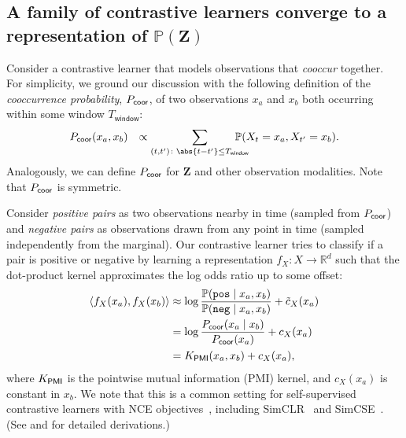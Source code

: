 \documentclass{article}
\theoremstyle{plain}
\theoremstyle{definition}
\theoremstyle{remark}
\begin{document}
\subsection{A family of contrastive learners converge to a representation of $\mathbb{P}(\mathbf{Z})$}
\label{sec:simple-contra-kpmi}

Consider a contrastive learner that models observations that \textit{cooccur} together. For simplicity, we ground our discussion with the following definition of the \textit{cooccurrence probability}, ${P}_\mathsf{coor}$, of two observations $x_a$ and $x_b$ both occurring within some  window $T_\mathsf{window}$: %
\begin{align}
    \Pco(x_a, x_b) \hspace{0.1in} \propto \hspace{-0in} \sum_{(t, t') \colon \abs{t-t'} \leq T_\mathsf{window}} \hspace{-0.2in} \mathbb{P}(X_t = x_a, X_{t'} = x_b).\nonumber
\end{align}
Analogously, we can define ${P}_\mathsf{coor}$ for $\mathbf{Z}$ and other observation modalities. Note that ${P}_\mathsf{coor}$ is symmetric.

Consider \emph{positive pairs} as two observations nearby in time (sampled from ${P}_\mathsf{coor}$) and \emph{negative pairs} as observations drawn from any point in time (sampled independently from the marginal). Our contrastive learner tries to classify if a pair is positive or negative by learning a representation $f_X \colon X \rightarrow \mathbb{R}^d$ such that the dot-product kernel approximates the log odds ratio up to some offset:
\begin{align}
    \langle f_X(x_a), f_X(x_b) \rangle 
    & \approx \log \frac{\mathbb{P}(\texttt{pos} \mathrel{\vert} x_a, x_b)}{\mathbb{P}(\texttt{neg} \mathrel{\vert} x_a, x_b)} + \tilde{c}_X(x_a) \\
    & = \log \frac{{P}_\mathsf{coor}(x_a \mathrel{\vert} x_b)}{{P}_\mathsf{coor}(x_a)} + c_X(x_a) \\
    & =  K_\mathsf{PMI}(x_a, x_b) + c_X(x_a), \label{eqn:contr-pmi}
\end{align}
where $K_\mathsf{PMI}$ is the pointwise mutual information (PMI) kernel, and $c_X(x_a)$ is constant in $x_b$. We note that this is a common setting for self-supervised contrastive learners with NCE objectives~\cite{gutmann2010noise,oord2018representation}, including SimCLR~\cite{chen2020simple} and SimCSE~\cite{gao2021simcse}.  (See \citet{oord2018representation} and  for detailed derivations.)
\end{document}
